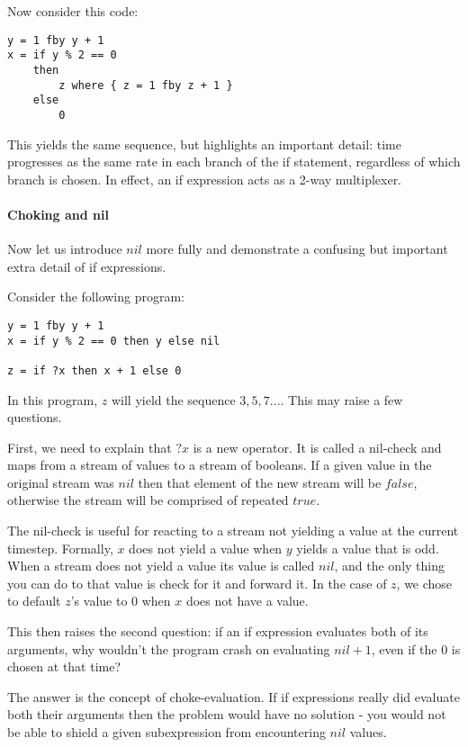 \documentclass{scrartcl}
\begin{document}
    Now consider this code:
    
    \begin{lstlisting}
y = 1 fby y + 1
x = if y % 2 == 0
    then
        z where { z = 1 fby z + 1 }
    else
        0
    \end{lstlisting}
    
    This yields the same sequence, but highlights an important detail: time progresses as the same rate in each branch of the if statement, regardless of which branch is chosen. In effect, an if expression acts as a 2-way multiplexer.
    
    \paragraph{Choking and nil}
    
    Now let us introduce $nil$ more fully and demonstrate a confusing but important extra detail of if expressions.
    
    Consider the following program:
    
    \begin{lstlisting}
y = 1 fby y + 1
x = if y % 2 == 0 then y else nil

z = if ?x then x + 1 else 0
    \end{lstlisting}
    
    In this program, $z$ will yield the sequence $3, 5, 7 ...$. This may raise a few questions.
    
    First, we need to explain that $?x$ is a new operator. It is called a nil-check and maps from a stream of values to a stream of booleans. If a given value in the original stream was $nil$ then that element of the new stream will be $false$, otherwise the stream will be comprised of repeated $true$.
    
    The nil-check is useful for reacting to a stream not yielding a value at the current timestep. Formally, $x$ does not yield a value when $y$ yields a value that is odd. When a stream does not yield a value its value is called $nil$, and the only thing you can do to that value is check for it and forward it. In the case of $z$, we chose to default $z$'s value to $0$ when $x$ does not have a value.
    
    This then raises the second question: if an if expression evaluates both of its arguments, why wouldn't the program crash on evaluating $nil + 1$, even if the $0$ is chosen at that time?
    
    The answer is the concept of choke-evaluation. If if expressions really did evaluate both their arguments then the problem would have no solution - you would not be able to shield a given subexpression from encountering $nil$ values.
    
\end{document}
